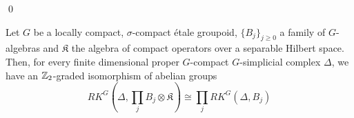\begin{dem}
\qed
\end{dem}

\begin{lem}\label{prod}
Let $G$ be a locally compact, $\sigma$-compact étale groupoid, $\{B_j\}_{j\geq  0}$ a family of $G$-algebras and $\mathfrak K$ the algebra of compact operators over a separable Hilbert space. Then, for every finite dimensional proper $G$-compact $G$-simplicial complex $\Delta$, we have an $\mathbb Z_2$-graded isomorphism of abelian groups
\[RK^G(\Delta,\prod_j B_j\otimes \mathfrak K)\cong \prod_j RK^G(\Delta,B_j)\]
\end{lem}


